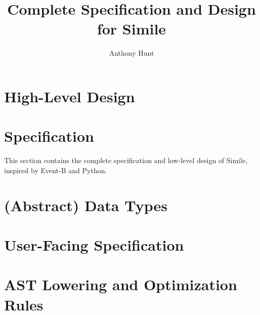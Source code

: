 \documentclass{article}
\title{Complete Specification and Design for Simile}
\author{Anthony Hunt}
\begin{document}
\maketitle
\tableofcontents
\newpage

\section{High-Level Design}





\section{Specification}
This section contains the complete specification and low-level design of Simile, inspired by Event-B and Python.








\section{(Abstract) Data Types}



\section{User-Facing Specification}



\section{AST Lowering and Optimization Rules}
\end{document}
